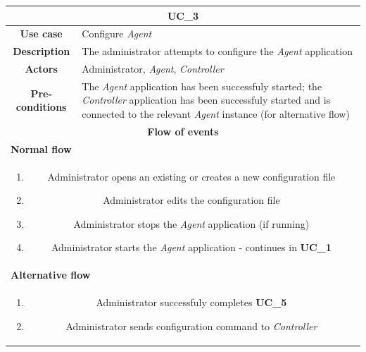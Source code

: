 \documentclass[12pt,a4paper,table]{article}
\begin{document}
            \vspace{0.5cm}
            \noindent
            \begin{longtable}{ |c|p{11.8cm}| }
                \hline
                \multicolumn{2}{|c|}{\cellcolor{lime} \textbf{UC\_3}}\\ \hline
                \cellcolor[gray]{0.9} \textbf{Use case} & Configure \textit{Agent}\\ \hline
                \cellcolor[gray]{0.9} \textbf{Description} & The administrator attempts to configure the \textit{Agent} application\\ \hline
                \cellcolor[gray]{0.9} \textbf{Actors} & Administrator, \textit{Agent}, \textit{Controller}\\ \hline
                \cellcolor[gray]{0.9} \textbf{Pre-conditions} & The \textit{Agent} application has been successfuly started; the \textit{Controller} application has been successfuly started and is connected to the relevant \textit{Agent} instance (for alternative flow)\\ \hline
                \multicolumn{2}{|c|}{\cellcolor[gray]{0.9} \textbf{Flow of events}}\\ \hline
                \multicolumn{2}{|l|}{\cellcolor[gray]{0.9} \textbf{Normal flow}}\\ \hline
                \multicolumn{2}{|p{14cm}|}{
                    \begin{enumerate}
                        \item Administrator opens an existing or creates a new configuration file
                        \item Administrator edits the configuration file
                        \item Administrator stops the \textit{Agent} application (if running)
                        \item Administrator starts the \textit{Agent} application - continues in \textbf{UC\_1}
                    \end{enumerate}
                }\\ \hline
                \multicolumn{2}{|l|}{\cellcolor[gray]{0.9} \textbf{Alternative flow}}\\ \hline
                \multicolumn{2}{|p{14cm}|}{
                    \begin{enumerate}
                        \item Administrator successfuly completes \textbf{UC\_5}
                        \item Administrator sends configuration command to \textit{Controller}

\end{enumerate}}
\end{longtable}
\end{document}
